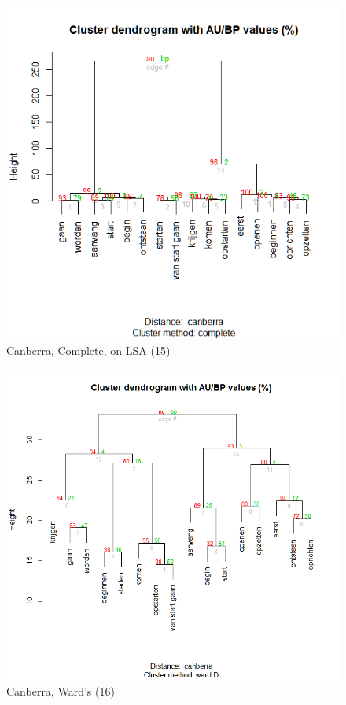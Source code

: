 \begin{figure}
\includegraphics[height=.3\textheight]{figures/Vandevoorde2-img44.png}
\caption{\label{fig:key:44}  Canberra, Complete, on LSA (15)}
\end{figure}

\begin{figure}
\includegraphics[height=.3\textheight]{figures/Vandevoorde2-img45.png}
\caption{\label{fig:key:45}  Canberra, Ward’s (16)}
\end{figure}

